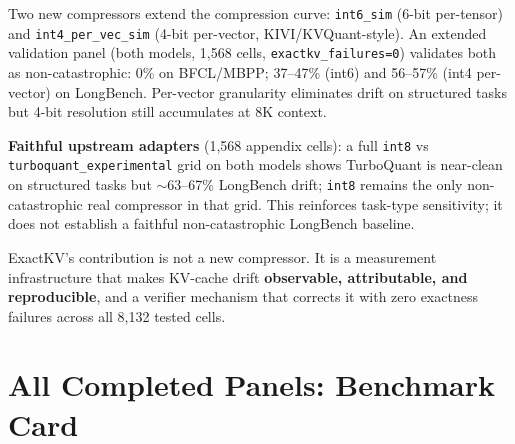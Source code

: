 \documentclass[11pt]{article}
\begin{document}
\begin{sloppypar}
Two new compressors extend the compression curve: \texttt{int6\_sim} (6-bit per-tensor)
and \texttt{int4\_per\_vec\_sim} (4-bit per-vector, KIVI/KVQuant-style). An extended
validation panel (both models, 1,568 cells, \texttt{exactkv\_failures=0}) validates both as
non-catastrophic: 0\% on BFCL/MBPP; 37--47\% (int6) and 56--57\% (int4 per-vector)
on LongBench. Per-vector granularity eliminates drift on structured tasks but
4-bit resolution still accumulates at 8K context.

\textbf{Faithful upstream adapters} (1,568 appendix cells): a full \texttt{int8} vs
\texttt{turboquant\_experimental} grid on both models shows TurboQuant is near-clean on
structured tasks but $\sim$63--67\% LongBench drift; \texttt{int8} remains the only
non-catastrophic real compressor in that grid. This reinforces task-type sensitivity;
it does not establish a faithful non-catastrophic LongBench baseline.

ExactKV's contribution is not a new compressor. It is a measurement infrastructure that
makes KV-cache drift \textbf{observable, attributable, and reproducible}, and a verifier
mechanism that corrects it with zero exactness failures across all 8,132 tested cells.
\end{sloppypar}

\clearpage
\appendix
\section{All Completed Panels: Benchmark Card}
\end{document}
